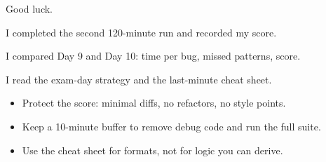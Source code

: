 \documentclass[10pt,a4paper]{article}
\begin{document}
Good luck.
\begin{checklistbox}
\begin{checklist}
\item I completed the second 120-minute run and recorded my score.
\item I compared Day 9 and Day 10: time per bug, missed patterns, score.
\item I read the exam-day strategy and the last-minute cheat sheet.
\end{checklist}
\scoreline
\end{checklistbox}
\begin{examlensbox}
\begin{itemize}
\item Protect the score: minimal diffs, no refactors, no style points.
\item Keep a 10-minute buffer to remove debug code and run the full suite.
\item Use the cheat sheet for formats, not for logic you can derive.
\end{itemize}
\end{examlensbox}
\bugjournalifspace
\end{document}
